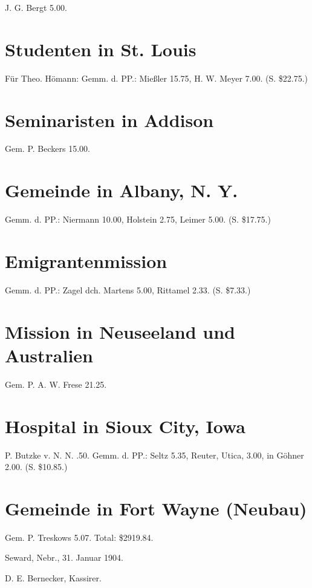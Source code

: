 J. G. Bergt 5.00.

\section{Studenten in St. Louis}

Für Theo. Hömann: Gemm. d. PP.: Mießler 15.75, H. W. Meyer 7.00. (S. \$22.75.)

\section{Seminaristen in Addison}

Gem. P. Beckers 15.00.

\section{Gemeinde in Albany, N. Y.}

Gemm. d. PP.: Niermann 10.00, Holstein 2.75, Leimer 5.00. (S. \$17.75.)

\section{Emigrantenmission}

Gemm. d. PP.: Zagel dch. Martens 5.00, Rittamel 2.33. (S. \$7.33.)

\section{Mission in Neuseeland und Australien}

Gem. P. A. W. Frese 21.25.

\section{Hospital in Sioux City, Iowa}

P. Butzke v. N. N. .50. Gemm. d. PP.: Seltz 5.35, Reuter, Utica, 3.00, in Göhner 2.00. (S. \$10.85.)

\section{Gemeinde in Fort Wayne (Neubau)}

Gem. P. Treskows 5.07. Total: \$2919.84.

Seward, Nebr., 31. Januar 1904.

D. E. Bernecker, Kassirer.
